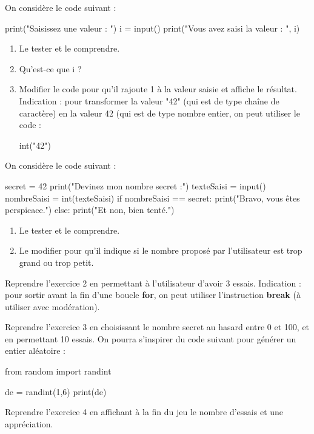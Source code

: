 \documentclass[a4paper,11pt,DIV18,BCOR0mm]{scrartcl}
\begin{document}
\begin{exercice}
On considère le code suivant :
\begin{python}
print("Saisissez une valeur : ")
i = input()
print("Vous avez saisi la valeur : ", i)
\end{python}
\begin{enumerate}
  \item Le tester et le comprendre.
  \item Qu'est-ce que i ?
  \item Modifier le code pour qu'il rajoute 1 à la valeur saisie et
  affiche le résultat. Indication : pour transformer la valeur 
  "42" (qui est de type chaîne de caractère) en la valeur 42 (qui est
  de type nombre entier, on peut utiliser le code :
  \begin{python}
  int("42")
  \end{python}
\end{enumerate}
\end{exercice}


\begin{exercice}
On considère le code suivant :
\begin{python}
secret = 42
print("Devinez mon nombre secret :")
texteSaisi = input()
nombreSaisi = int(texteSaisi)
if nombreSaisi == secret:
    print("Bravo, vous êtes perspicace.")
else:
    print("Et non, bien tenté.")
\end{python}
\begin{enumerate}
\item Le tester et le comprendre.
\item Le modifier pour qu'il indique si le nombre proposé
par l'utilisateur est trop grand ou trop petit.
\end{enumerate}
\end{exercice}

\begin{exercice}
Reprendre l'exercice 2 en permettant à l'utilisateur
d'avoir 3 essais. Indication : pour sortir avant la
fin d'une boucle \textbf{for}, on peut utiliser
l'instruction \textbf{break} (à utiliser avec modération).
\end{exercice}

\begin{exercice}
Reprendre l'exercice 3 en choisissant le nombre secret au hasard
entre 0 et 100, et en permettant 10 essais. On pourra s'inspirer du code suivant 
pour générer un entier aléatoire :
\begin{python}
from random import randint

de = randint(1,6)
print(de)
\end{python}
\end{exercice}

\begin{exercice}
Reprendre l'exercice 4 en affichant à la fin du jeu
le nombre d'essais
et une appréciation. 
\end{exercice}
\end{document}
